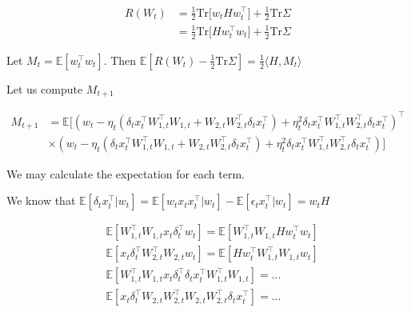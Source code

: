 \documentclass{article}
\newcommand{\E}{\mathbb{E}}
\newcommand{\tr}{\mathrm{Tr}}
\begin{document}
\begin{align*}
R(W_t) &= \frac{1}{2}\tr \big[w_tH w_t^\top ] + \frac{1}{2} \tr\Sigma\\
&= \frac{1}{2}\tr \big[H w_t^\top w_t ] + \frac{1}{2} \tr\Sigma
\end{align*}

Let $M_t =\E[ w_t^\top w_t]$.
Then $\E[R(W_t) - \frac{1}{2} \tr\Sigma] =  \frac{1}{2} \langle  H, M_t\rangle $

Let us compute $M_{t+1}$


\begin{align*}
M_{t+1} &= \E[\left( w_t - \eta_t(\delta_t x_t ^\top W_{1,t}^\top  W_{1,t} + W_{2,t} W_{2,t}^\top \delta_t x_t ^\top) + \eta_t^2 \delta_t x_t ^\top W_{1,t}^\top W_{2,t}^\top \delta_t x_t ^\top\right)^\top \\ & \times \left( w_t - \eta_t(\delta_t x_t ^\top W_{1,t}^\top  W_{1,t} + W_{2,t} W_{2,t}^\top \delta_t x_t ^\top) + \eta_t^2 \delta_t x_t ^\top W_{1,t}^\top W_{2,t}^\top \delta_t x_t ^\top \right)]
\end{align*}


We may calculate the expectation for each term.

We know that $\E[\delta_t x_t^\top |w_t ]=\E[w_t x_t x_t^\top |w_t] - \E[\epsilon_t x_t^\top|w_t] = w_t H$

\begin{align*}
&\E[W_{1,t}^\top W_{1,t} x_t \delta_t^\top w_t]   = \E[W_{1,t}^\top W_{1,t} H w_t^\top w_t]
\\&
\E[x_t  \delta_t^\top  W_{2,t}^\top W_{2,t}  w_t]   = \E[H w_t^\top W_{1,t}^\top W_{1,t}  w_t]
\\&
\E[W_{1,t}^\top W_{1,t} x_t \delta_t^\top \delta_t x_t ^\top W_{1,t}^\top  W_{1,t}  ]   = ...
\\&
\E[ x_t \delta_t^\top W_{2,t}  W_{2,t}^\top W_{2,t} W_{2,t}^\top \delta_t x_t^\top   ]   = ...
\end{align*}
\end{document}

